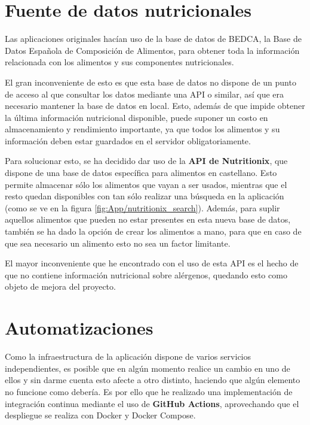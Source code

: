 
\section{Fuente de datos nutricionales}

Las aplicaciones originales hacían uso de la base de datos de BEDCA, la Base de Datos Española de Composición de Alimentos, para obtener toda la información relacionada con los alimentos y sus componentes nutricionales. 

El gran inconveniente de esto es que esta base de datos no dispone de un punto de acceso al que consultar los datos mediante una API o similar, así que era necesario mantener la base de datos en local. Esto, además de que impide obtener la última información nutricional disponible, puede suponer un costo en almacenamiento y rendimiento importante, ya que todos los alimentos y su información deben estar guardados en el servidor obligatoriamente.

Para solucionar esto, se ha decidido dar uso de la \textbf{API de Nutritionix}, que dispone de una base de datos específica para alimentos en castellano. Esto permite almacenar sólo los alimentos que vayan a ser usados, mientras que el resto quedan disponibles con tan sólo realizar una búsqueda en la aplicación (como se ve en la figura \ref{fig:App/nutritionix_search}). Además, para suplir aquellos alimentos que pueden no estar presentes en esta nueva base de datos, también se ha dado la opción de crear los alimentos a mano, para que en caso de que sea necesario un alimento esto no sea un factor limitante. 


El mayor inconveniente que he encontrado con el uso de esta API es el hecho de que no contiene información nutricional sobre alérgenos, quedando esto como objeto de mejora del proyecto.

\section{Automatizaciones}

Como la infraestructura de la aplicación dispone de varios servicios independientes, es posible que en algún momento realice un cambio en uno de ellos y sin darme cuenta esto afecte a otro distinto, haciendo que algún elemento no funcione como debería. Es por ello que he realizado una implementación de integración continua mediante el uso de \textbf{GitHub Actions}, aprovechando que el despliegue se realiza con Docker y Docker Compose. 

